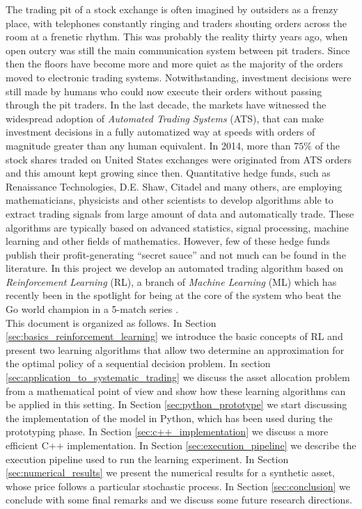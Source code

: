 The trading pit of a stock exchange is often imagined by outsiders as a frenzy place, with telephones constantly ringing and traders shouting orders across the room at a frenetic rhythm. This was probably the reality thirty years ago, when open outcry was still the main communication system between pit traders. Since then the floors have become more and more quiet as the majority of the orders moved to electronic trading systems. Notwithstanding, investment decisions were still made by humans who could now execute their orders without passing through the pit traders. In the last decade, the markets have witnessed the widespread adoption of \emph{Automated Trading Systems} (ATS), that can make investment decisions in a fully automatized way at speeds with orders of magnitude greater than any human equivalent. In 2014, more than $75\%$ of the stock shares traded on United States exchanges were originated from ATS orders and this amount kept growing since then. Quantitative hedge funds, such as Renaissance Technologies, D.E. Shaw, Citadel and many others, are employing mathematicians, physicists and other scientists to develop algorithms able to extract trading signals from large amount of data and automatically trade. These algorithms are typically based on advanced statistics, signal processing, machine learning and other fields of mathematics. However, few of these hedge funds publish their profit-generating ``secret sauce'' and not much can be found in the literature. In this project we develop an automated trading algorithm based on \emph{Reinforcement Learning} (RL), a branch of \emph{Machine Learning} (ML) which has recently been in the spotlight for being at the core of the system who beat the Go world champion in a 5-match series \cite{silver2016mastering}.\\
This document is organized as follows. In Section \ref{sec:basics_reinforcement_learning} we introduce the basic concepts of RL and present two learning algorithms that allow two determine an approximation for the optimal policy of a sequential decision problem. In section \ref{sec:application_to_systematic_trading} we discuss the asset allocation problem from a mathematical point of view and show how these learning algorithms can be applied in this setting. In Section \ref{sec:python_prototype} we start discussing the implementation of the model in Python, which has been used during the prototyping phase. In Section \ref{sec:c++_implementation} we discuss a more efficient C++ implementation. In Section \ref{sec:execution_pipeline} we describe the execution pipeline used to run the learning experiment. In Section \ref{sec:numerical_results} we present the numerical results for a synthetic asset, whose price follows a particular stochastic process. In Section \ref{sec:conclusion} we conclude with some final remarks and we discuss some future research directions. 



